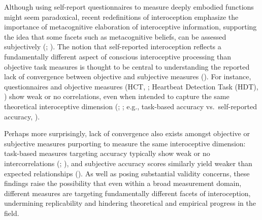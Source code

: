 \documentclass[
  jou,
  floatsintext,
  longtable,
  nolmodern,
  notxfonts,
  notimes,
  colorlinks=true,linkcolor=blue,citecolor=blue,urlcolor=blue]{apa7}
\begin{document}
Although using self-report questionnaires to measure deeply embodied
functions might seem paradoxical, recent redefinitions of interoception
emphasize the importance of metacognitive elaboration of interoceptive
information, supporting the idea that some facets such as metacognitive
beliefs, can be assessed subjectively
(; ). The notion that self-reported interoception reflects
a fundamentally different aspect of conscious interoceptive processing
than objective task measures is thought to be central to understanding
the reported lack of convergence between objective and subjective
measures (). For
instance, questionnaires and objective measures (HCT,
; Heartbeat Detection
Task (HDT), ) show weak or no correlations, even when intended to capture the
same theoretical interoceptive dimension
(;
; e.g., task-based accuracy
vs.~self-reported accuracy, ).

Perhaps more surprisingly, lack of convergence also exists amongst
objective or subjective measures purporting to measure the same
interoceptive dimension: task-based measures targeting accuracy
typically show weak or no intercorrelations
(;
), and
subjective accuracy scores similarly yield weaker than expected
relationships ().
As well as posing substantial validity concerns, these findings raise
the possibility that even within a broad measurement domain, different
measures are targeting fundamentally different facets of interoception,
undermining replicability and hindering theoretical and empirical
progress in the field.
\end{document}
